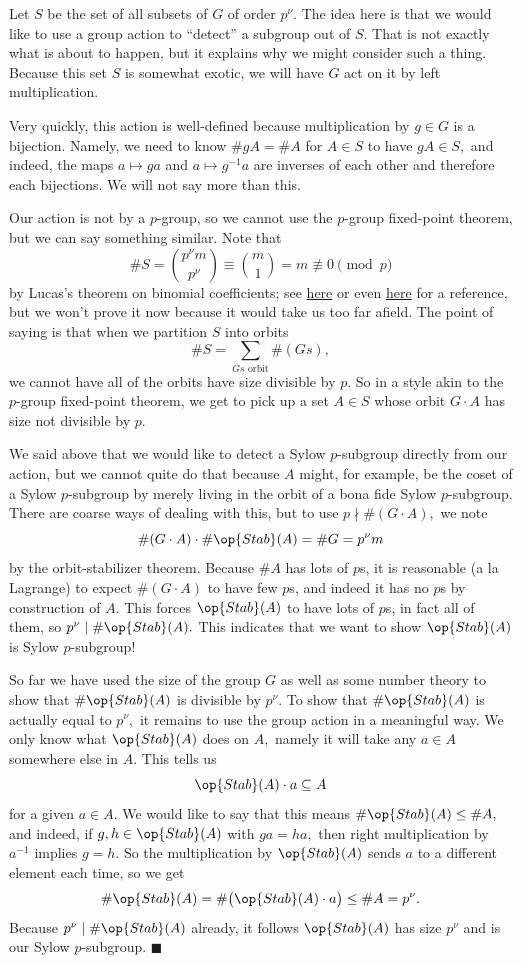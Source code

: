 Let $S$ be the set of all subsets of $G$ of order $p^\nu.$ The idea here is that we would like to use a group action to ``detect'' a subgroup out of $S.$ That is not exactly what is about to happen, but it explains why we might consider such a thing. Because this set $S$ is somewhat exotic, we will have $G$ act on it by left multiplication.

Very quickly, this action is well-defined because multiplication by $g\in G$ is a bijection. Namely, we need to know $\#gA=\#A$ for $A\in S$ to have $gA\in S,$ and indeed, the maps $a\mapsto ga$ and $a\mapsto g^{-1}a$ are inverses of each other and therefore each bijections. We will not say more than this.

Our action is not by a $p$-group, so we cannot use the $p$-group fixed-point theorem, but we can say something similar. Note that
\[\#S=\binom{p^\nu m}{p^\nu}\equiv\binom m1=m\not\equiv0\pmod p\]
by Lucas's theorem on binomial coefficients; see \href{https://en.wikipedia.org/wiki/Lucas's_theorem}{here} or even \href{https://dfoiler.github.io/TIL/2020/9/17/}{here} for a reference, but we won't prove it now because it would take us too far afield. The point of saying is that when we partition $S$ into orbits
\[\#S=\sum_{Gs\text{ orbit}}\#(Gs),\]
we cannot have all of the orbits have size divisible by $p.$ So in a style akin to the $p$-group fixed-point theorem, we get to pick up a set $A\in S$ whose orbit $G\cdot A$ has size not divisible by $p.$

We said above that we would like to detect a Sylow $p$-subgroup directly from our action, but we cannot quite do that because $A$ might, for example, be the coset of a Sylow $p$-subgroup by merely living in the orbit of a bona fide Sylow $p$-subgroup. There are coarse ways of dealing with this, but to use $p\nmid\#(G\cdot A),$ we note
\[\#(G\cdot A)\cdot\#\op{Stab}(A)=\#G=p^\nu m\]
by the orbit-stabilizer theorem. Because $\#A$ has lots of $p$s, it is reasonable (a la Lagrange) to expect $\#(G\cdot A)$ to have few $p$s, and indeed it has no $p$s by construction of $A.$ This forces $\op{Stab}(A)$ to have lots of $p$s, in fact all of them, so $p^\nu\mid\#\op{Stab}(A).$ This indicates that we want to show $\op{Stab}(A)$ is Sylow $p$-subgroup!

So far we have used the size of the group $G$ as well as some number theory to show that $\#\op{Stab}(A)$ is divisible by $p^\nu.$ To show that $\#\op{Stab}(A)$ is actually equal to $p^\nu,$ it remains to use the group action in a meaningful way. We only know what $\op{Stab}(A)$ does on $A,$ namely it will take any $a\in A$ somewhere else in $A.$ This tells us
\[\op{Stab}(A)\cdot a\subseteq A\]
for a given $a\in A.$ We would like to say that this means $\#\op{Stab}(A)\le\#A,$ and indeed, if $g,h\in\op{Stab}(A)$ with $ga=ha,$ then right multiplication by $a^{-1}$ implies $g=h.$ So the multiplication by $\op{Stab}(A)$ sends $a$ to a different element each time, so we get
\[\#\op{Stab}(A)=\#\big(\op{Stab}(A)\cdot a\big)\le\#A=p^\nu.\]
Because $p^\nu\mid\#\op{Stab}(A)$ already, it follows $\op{Stab}(A)$ has size $p^\nu$ and is our Sylow $p$-subgroup. $\blacksquare$

